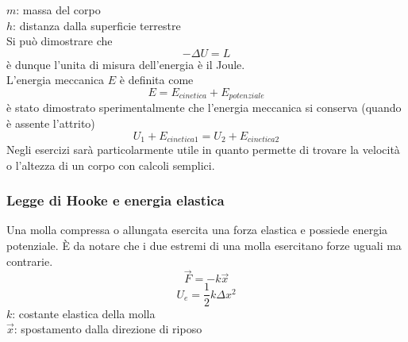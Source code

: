$m$: massa del corpo\\
$h$: distanza dalla superficie terrestre\\ [\baselineskip]
Si può dimostrare che
\begin{equation*}
  -\Delta U = L
\end{equation*}
è dunque l'unita di misura dell'energia è il Joule.\\ [\baselineskip]
L'energia meccanica $E$ è definita come
\begin{equation*}
  E=E_{cinetica}+E_{potenziale}
\end{equation*}
è stato dimostrato sperimentalmente che l'energia meccanica si conserva (quando è assente 
l'attrito)
\begin{equation*}
  U_1 + E_{cinetica1} = U_2 + E_{cinetica2}
\end{equation*}
Negli esercizi sarà particolarmente utile in quanto permette di trovare la velocità o l'altezza di
un corpo con calcoli semplici.\\ [\baselineskip]

\subsubsection{Legge di Hooke e energia elastica}
Una molla compressa o allungata esercita una forza elastica e possiede energia potenziale. È da 
notare che i due estremi di una molla esercitano forze uguali ma contrarie.
\begin{equation*}
  \vec{F} = -k\vec{x}
\end{equation*}
\begin{equation*}
  U_e = \frac{1}{2}k\Delta x^2
\end{equation*}
$k$: costante elastica della molla\\
$\vec{x}$: spostamento dalla direzione di riposo\\[\baselineskip]

